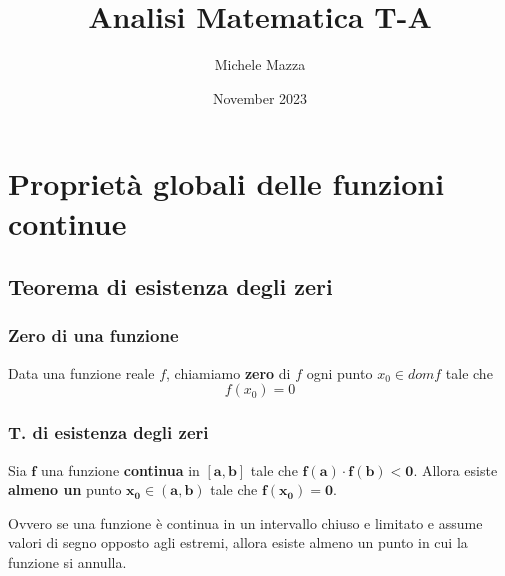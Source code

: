 \documentclass{book}
\title{Analisi Matematica T-A}
\author{Michele Mazza}
\date{November 2023}
\begin{document}
\frontmatter
\maketitle
\tableofcontents
\mainmatter

\chapter{Proprietà globali delle funzioni continue}

\section{Teorema di esistenza degli zeri}
\begin{definition}
    \subsection{Zero di una funzione}
    Data una funzione reale \(f\), chiamiamo \textbf{zero} di \(f\) ogni punto \(x_0 \in dom f\) tale che \[f(x_0) = 0\]
\end{definition}

\begin{theorem}
    \subsection{T. di esistenza degli zeri}
    Sia \(\mathbf{f}\) una funzione \textbf{continua} in \(\mathbf{[a, b]}\) tale che \(\mathbf{f(a) \cdot f(b) < 0}\). Allora esiste \textbf{almeno un} punto \(\mathbf{x_0 \in (a, b)}\) tale che \(\mathbf{f(x_0) = 0}\).

    \noindent Ovvero se una funzione è continua in un intervallo chiuso e limitato e assume valori di segno opposto agli estremi, allora esiste almeno un punto in cui la funzione si annulla.
\end{theorem}
\end{document}
